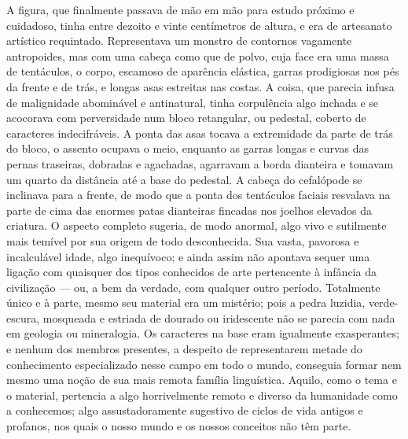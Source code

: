 A figura, que finalmente passava de mão em mão para estudo próximo e
cuidadoso, tinha entre dezoito e vinte centímetros de altura, e era de
artesanato artístico requintado. Representava um monstro de contornos
vagamente antropoides, mas com uma cabeça como que de polvo, cuja face
era uma massa de tentáculos, o corpo, escamoso de aparência elástica,
garras prodigiosas nos pés da frente e de trás, e longas asas estreitas
nas costas. A coisa, que parecia infusa de malignidade abominável e
antinatural, tinha corpulência algo inchada e se acocorava com
perversidade num bloco retangular, ou pedestal, coberto de caracteres
indecifráveis. A ponta das asas tocava a extremidade da parte de trás
do bloco, o assento ocupava o meio, enquanto as garras longas e curvas
das pernas traseiras, dobradas e agachadas, agarravam a borda dianteira
e tomavam um quarto da distância até a base do pedestal. A cabeça do
cefalópode se inclinava para a frente, de modo que a ponta dos
tentáculos faciais resvalava na parte de cima das enormes patas
dianteiras fincadas nos joelhos elevados da criatura. O aspecto completo
sugeria, de modo anormal, algo vivo e sutilmente mais temível por sua
origem de todo desconhecida. Sua vasta, pavorosa e incalculável idade,
algo inequívoco; e ainda assim não apontava sequer uma ligação com
quaisquer dos tipos conhecidos de arte pertencente à infância da
civilização --- ou, a bem da verdade, com qualquer outro período.
Totalmente único e à parte, mesmo seu material era um mistério; pois a
pedra luzidia, verde-escura, mosqueada e estriada de dourado ou
iridescente não se parecia com nada em geologia ou mineralogia. Os
caracteres na base eram igualmente exasperantes; e nenhum dos membros
presentes, a despeito de representarem metade do conhecimento
especializado nesse campo em todo o mundo, conseguia formar nem mesmo
uma noção de sua mais remota família linguística. Aquilo, como o tema e
o material, pertencia a algo horrivelmente remoto e diverso da
humanidade como a conhecemos; algo assustadoramente sugestivo de ciclos
de vida antigos e profanos, nos quais o nosso mundo e os nossos
conceitos não têm parte.

